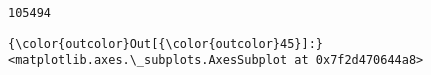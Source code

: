 \documentclass[11pt]{article}
\begin{document}
    \begin{Verbatim}[commandchars=\\\{\}]
105494

    \end{Verbatim}

\begin{Verbatim}[commandchars=\\\{\}]
{\color{outcolor}Out[{\color{outcolor}45}]:} <matplotlib.axes.\_subplots.AxesSubplot at 0x7f2d470644a8>
\end{Verbatim}
            
    \begin{center}
    \end{center}
    { \hspace*{\fill} \\}
    
\end{document}
